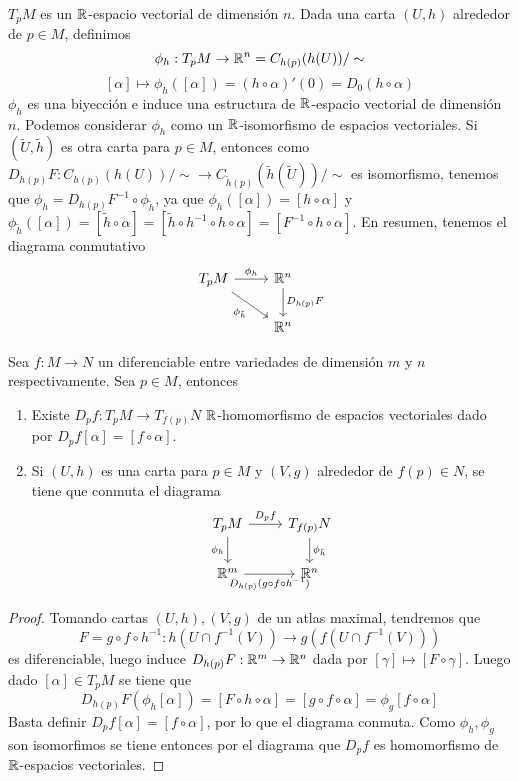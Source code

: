 \documentclass[CV.tex]{subfiles}
\begin{document}
\begin{nota}
$T_pM$ es un $\mathbb{R}$-espacio vectorial de dimensión $n$. Dada una carta $(U,h)$ alrededor de $p\in M$, definimos
\[
\phi_h:T_pM\to \mathbb{R}^n=C_{h(p)}(h(U))/\sim 
\]
\[
[\alpha]\mapsto \phi_h([\alpha])=(h\circ\alpha)'(0)=D_0(h\circ\alpha)
\]
$\phi_h$ es una biyección e induce una estructura de $\mathbb{R}$-espacio vectorial de dimensión $n$. Podemos considerar $\phi_h$ como un $\mathbb{R}$-isomorfismo de espacios vectoriales. Si $(\widetilde{U},\tilde{h})$ es otra carta para $p\in M$, entonces como $D_{h(p)}F:C_{h(p)}(h(U))/\sim\to C_{\tilde{h}(p)}(\tilde{h}(\widetilde{U}))/\sim$ es isomorfismo, tenemos que $\phi_h=D_{h(p)}F^{-1}\circ \phi_{\tilde{h}}$, ya que $\phi_h([\alpha])=[h\circ\alpha]$ y $\phi_{\tilde{h}}([\alpha])=[\tilde{h}\circ\alpha]=[\tilde{h} \circ h^{-1}\circ h\circ \alpha]=[F^{-1} \circ h \circ \alpha]$. En resumen, tenemos el diagrama conmutativo
\[
\begin{tikzcd}
T_pM \arrow[r, "\phi_h"]\arrow[dr, "\phi_{\tilde{h}}"'] & \R^n\arrow[d, "D_{h(p)}F"]\\
& \R^n
\end{tikzcd}
\]
\end{nota}

\begin{lemma}
Sea $f:M\to N$ un diferenciable entre variedades de dimensión $m$ y $n$ respectivamente. Sea $p\in M$, entonces
\begin{enumerate}
\item Existe $D_pf:T_pM\to T_{f(p)}N$ $\mathbb{R}$-homomorfismo de espacios vectoriales dado por $D_pf[\alpha]=[f\circ\alpha]$.
\item Si $(U,h)$ es una carta para $p\in M$ y $(V,g)$ alrededor de $f(p)\in N$, se tiene que conmuta el diagrama
\[
\begin{tikzcd}
T_pM\arrow[r, "D_pf"]\arrow[d, "\phi_h"'] & T_{f(p)}N\arrow[d, "\phi_{\tilde{h}}"]\\
\R^m\arrow[r, "D_{h(p)}(g\circ f\circ h^{-1})"'] & \R^n
\end{tikzcd}
\]
\end{enumerate}
\end{lemma}

\begin{proof}
 Tomando cartas $(U,h),(V,g)$ de un atlas maximal, tendremos que
\[
F=g\circ f\circ h^{-1}:h(U\cap f^{-1}(V))\to g(f(U\cap f^{-1}(V)))
\]
es diferenciable, luego induce $D_{h(p)}F:\mathbb{R}^m\to\mathbb{R}^n$  dada por $[\gamma]\mapsto[F\circ\gamma]$. Luego dado $[\alpha]\in T_pM$ se tiene que 
\[
D_{h(p)}F(\phi_h[\alpha])=[F\circ h\circ\alpha]=[g\circ f\circ \alpha]=\phi_g[f\circ\alpha]
\]
Basta definir $D_pf[\alpha]=[f\circ \alpha]$, por lo que el diagrama conmuta. Como $\phi_h,\phi_g$ son isomorfimos se tiene entonces por el diagrama que $D_pf$ es homomorfismo de $\mathbb{R}$-espacios vectoriales.
\end{proof}
\end{document}
